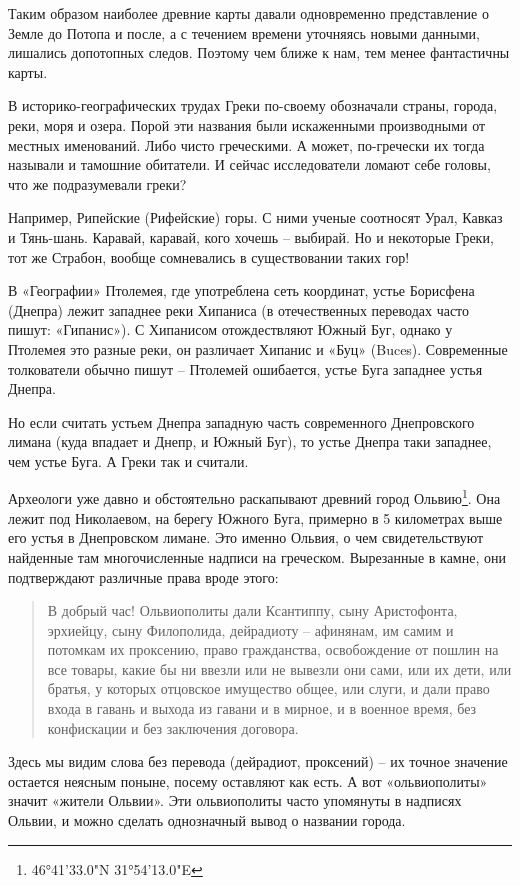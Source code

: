 Таким образом наиболее древние карты давали одновременно представление о Земле до Потопа и после, а с течением времени уточняясь новыми данными, лишались допотопных следов. Поэтому чем ближе к нам, тем менее фантастичны карты.

В историко-географических трудах Греки по-своему обозначали страны, города, реки, моря и озера. Порой эти названия были искаженными производными от местных именований. Либо чисто греческими. А может, по-гречески их тогда называли и тамошние обитатели. И сейчас исследователи ломают себе головы, что же подразумевали греки?

Например, Рипейские (Рифейские) горы. С ними ученые соотносят Урал, Кавказ и Тянь-шань. Каравай, каравай, кого хочешь – выбирай. Но и некоторые Греки, тот же Страбон, вообще сомневались в существовании таких гор!

В «Географии» Птолемея, где употреблена сеть координат, устье Борисфена (Днепра) лежит западнее реки Хипаниса (в отечественных переводах часто пишут: «Гипанис»). С Хипанисом отождествляют Южный Буг, однако у Птолемея это разные реки, он различает Хипанис и «Буц» (Buces). Современные толкователи обычно пишут – Птолемей ошибается, устье Буга западнее устья Днепра.

Но если считать устьем Днепра западную часть современного Днепровского лимана (куда впадает и Днепр, и Южный Буг), то устье Днепра таки западнее, чем устье Буга. А Греки так и считали.

Археологи уже давно и обстоятельно раскапывают  древний город Ольвию\footnote{46°41'33.0"N 31°54'13.0"E}. Она лежит под Николаевом, на берегу Южного Буга, примерно в 5 километрах выше его устья в Днепровском лимане. Это именно Ольвия, о чем свидетельствуют найденные там многочисленные надписи на греческом. Вырезанные в камне, они подтверждают различные права вроде этого\cite{olbia01}:

\begin{quotation} 
В добрый час! Ольвиополиты дали Ксантиппу, сыну Аристофонта, эрхиейцу, сыну Филополида, дейрадиоту – афинянам, им самим и потомкам их проксению, право гражданства, освобождение от пошлин на все товары, какие бы ни ввезли или не вывезли они сами, или их дети, или братья, у которых отцовское имущество общее, или слуги, и дали право входа в гавань и выхода из гавани и в мирное, и в военное время, без конфискации и без заключения договора.
\end{quotation} 

Здесь мы видим слова без перевода (дейрадиот, проксений) – их точное значение остается неясным поныне, посему оставляют как есть. А вот «ольвиополиты» значит «жители Ольвии». Эти ольвиополиты часто упомянуты в надписях Ольвии, и можно сделать однозначный вывод о названии города.

